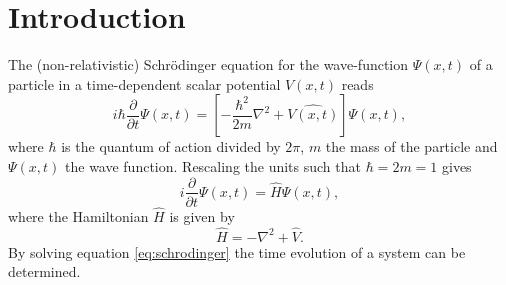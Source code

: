 \section{Introduction}
The (non-relativistic) Schr\"{o}dinger equation for the wave-function $\Psi(x,t)$ of a particle in a time-dependent scalar potential $V(x,t)$ reads 
\[
i\hbar \frac{\partial}{\partial t}\Psi(x,t) = \left[-\frac{\hbar^2}{2m}\nabla^2+\hat{V(x,t)}\right]\Psi(x,t),
\]
where $\hbar$ is the quantum of action divided by $2\pi$, $m$ the mass of the particle and $\Psi(x,t)$ the wave function.
Rescaling the units such that $\hbar = 2m = 1$ gives
\begin{equation}\label{eq:schrodinger}
i \frac{\partial}{\partial t}\Psi(x,t) = \hat{H}\Psi(x,t),
\end{equation}where the Hamiltonian $\hat{H}$ is given by
\[
\hat{H} = -\nabla^2+\hat{V}.
\] By solving equation \ref{eq:schrodinger} the time evolution of a system can be determined.